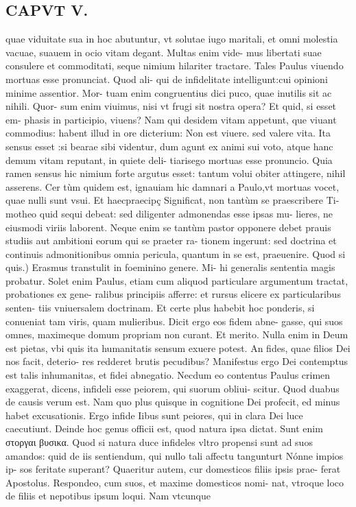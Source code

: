 \documentclass{article}
\begin{document}
\begin{pages}
\section*{CAPVT V. }
\marginpar{[ p.59 ]}\pstart quae viduitate sua in hoc abutuntur, vt solutae iugo maritali, et omni molestia vacuae, suauem in ocio vitam degant. Multas enim vide- mus libertati suae consulere et commoditati, seque nimium hilariter tractare. Tales Paulus viuendo mortuas esse pronunciat. Quod ali- qui de infidelitate intelligunt:cui opinioni minime assentior. Mor- tuam enim congruentius dici puco, quae inutilis sit ac nihili. Quor- sum enim viuimus, nisi vt frugi sit nostra opera? Et quid, si esset em- phasis in participio, viuens? Nam qui desidem vitam appetunt, que viuant commodius: habent illud in ore dicterium: Non est viuere. sed valere vita. Ita sensus esset :si bearae sibi videntur, dum agunt ex animi sui voto, atque hanc demum vitam reputant, in quiete deli- tiarisego mortuas esse pronuncio. Quia ramen sensus hic nimium forte argutus esset: tantum volui obiter attingere, nihil asserens. Cer tùm quidem est, ignauiam hic damnari a Paulo,vt mortuas vocet, quae nulli sunt vsui.  \pend\pstart Et haecpraecipç Significat, non tantùm se praescribere Ti- motheo quid sequi debeat: sed diligenter admonendas esse ipsas mu- lieres, ne eiusmodi viriis laborent. Neque enim se tantùm pastor opponere debet prauis studiis aut ambitioni eorum qui se praeter ra- tionem ingerunt: sed doctrina et continuis admonitionibus omnia pericula, quantum in se est, praeuenire.  \pend\pstart Quod si quis.) Erasmus transtulit in foeminino genere. Mi- hi generalis sententia magis probatur. Solet enim Paulus, etiam cum aliquod particulare argumentum tractat, probationes ex gene- ralibus principiis afferre: et rursus elicere ex particularibus senten- tiis vniuersalem doctrinam. Et certe plus habebit hoc ponderis, si conueniat tam viris, quam mulieribus. Dicit ergo eos fidem abne- gasse, qui suos omnes, maximeque domum propriam non curant. Et merito. Nulla enim in Deum est pietas, vbi quis ita humanitatis sensum exuere potest. An fides, quae filios Dei nos facit, deterio- res redderet brutis pecudibus? Manifestus ergo Dei contemptus est talis inhumanitas, et fidei abnegatio. Necdum eo contentus Paulus crimen exaggerat, dicens, infideli esse peiorem, qui suorum obliui- scitur. Quod duabus de causis verum est. Nam quo plus quisque in cognitione Dei profecit, ed minus habet excusationis. Ergo infide Iibus sunt peiores, qui in clara Dei luce caecutiunt. Deinde hoc genus officii est, quod natura ipsa dictat. Sunt enim στοργαι βυσικα. Quod si natura duce infideles vltro propensi sunt ad suos amandos: quid de iis sentiendum, qui nullo tali affectu tangunturt Nónne impios ip- sos feritate superant? Quaeritur autem, cur domesticos filiis ipsis prae- ferat Apostolus. Respondeo, cum suos, et maxime domesticos nomi- nat, vtroque loco de filiis et nepotibus ipsum loqui. Nam vtcunque  \pend

\end{pages}
\end{document}

